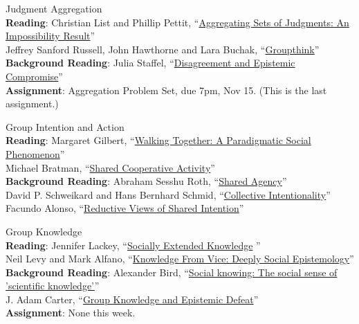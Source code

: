 \documentclass[10pt]{article}
\newcommand{\years}[1]{\vspace{2pt}\marginnote{\scriptsize #1}}
\begin{document}
\years{11/11-11/13} Judgment Aggregation \\
\textbf{Reading}: Christian List and Phillip Pettit, ``\href{https://philpapers.org/rec/LISASO-3}{Aggregating Sets of Judgments: An Impossibility Result}''\\
Jeffrey Sanford Russell, John Hawthorne and Lara Buchak, ``\href{https://philpapers.org/rec/RUSG}{Groupthink}'' \\
\textbf{Background Reading}: Julia Staffel, ``\href{https://philpapers.org/rec/STADAE-4}{Disagreement and Epistemic Compromise}'' \\
\textbf{Assignment}: Aggregation Problem Set, due 7pm, Nov 15. (This is the last assignment.)

\newpage
\years{11/18-11/27} Group Intention and Action \\
\textbf{Reading}: Margaret Gilbert, ``\href{https://philpapers.org/rec/GILWTA}{Walking Together: A Paradigmatic Social Phenomenon}'' \\
Michael Bratman, ``\href{https://philpapers.org/rec/BRASCA}{Shared Cooperative Activity}'' \\
\textbf{Background Reading}: Abraham Sesshu Roth, ``\href{http://plato.stanford.edu/entries/shared-agency/}{Shared Agency}''\\
David P. Schweikard and Hans Bernhard Schmid, ``\href{https://plato.stanford.edu/entries/collective-intentionality/}{Collective Intentionality}'' \\
Facundo Alonso, ``\href{https://philpapers.org/rec/ALORVO}{Reductive Views of Shared Intention}''

\years{12/2-12/4} Group Knowledge \\
\textbf{Reading}: Jennifer Lackey, ``\href{https://philpapers.org/rec/LACSEK}{Socially Extended Knowledge} ''\\
Neil Levy and Mark Alfano, ``\href{https://philpapers.org/rec/LEVKFV}{Knowledge From Vice: Deeply Social Epistemology}'' \\
\textbf{Background Reading}: Alexander Bird, ``\href{https://philpapers.org/rec/BIRSKT}{Social knowing: The social sense of 'scientific knowledge'}'' \\
J. Adam Carter, ``\href{https://philpapers.org/rec/CARGKA-3}{Group Knowledge and Epistemic Defeat}'' \\
\textbf{Assignment}: None this week.
\end{document}
